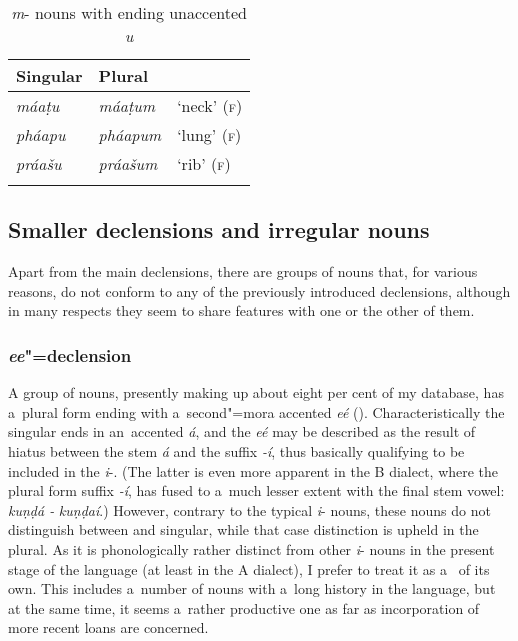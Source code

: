 \begin{table}[ht]
\caption{\textit{m}- nouns with ending unaccented \textit{u}}
\begin{tabularx}{\textwidth}{ Q Q Q }
\lsptoprule
Singular &
Plural &
\\\midrule
\textit{máaṭu} &
\textit{máaṭum} &
`neck' (\textsc{f})\\
\textit{pháapu} &
\textit{pháapum} &
`lung' (\textsc{f})\\
\textit{práašu} &
\textit{práašum} &
`rib' (\textsc{f})\\\lspbottomrule
\end{tabularx}
\label{tab:4-17}
\end{table}


\subsection{Smaller declensions and irregular nouns}
\label{subsec:4-6-4}

Apart from the main declensions, there are groups of nouns that, for various reasons, do not conform to any of the previously introduced declensions, although in many respects they seem to share features with one or the other of them.

\subsubsection*{\textit{ee}"=declension}

A group of nouns, presently making up about eight per cent of my database, has a~plural form ending with a~second"=mora accented \textit{eé} (). Characteristically the  singular ends in an~accented \textit{á}, and the \textit{eé} may be described as the result of hiatus between the stem \textit{á} and the suffix \textit{-í}, thus basically qualifying to be included in the \textit{i}-. (The latter is even more apparent in the B dialect, where the plural form suffix \textit{-í}, has fused to a~much lesser extent with the final stem vowel: \textit{kuṇḍá -} \textit{kuṇḍaí}.) However, contrary to the typical \textit{i}- nouns, these nouns do not distinguish between  and  singular, while that case distinction is upheld in the plural. As it is phonologically rather distinct from other \textit{i}- nouns in the present stage of the language (at least in the A dialect), I prefer to treat it as a~ of its own. This  includes a~number of nouns with a~long history in the language, but at the same time, it seems a~rather productive one as far as incorporation of more recent loans are concerned.


